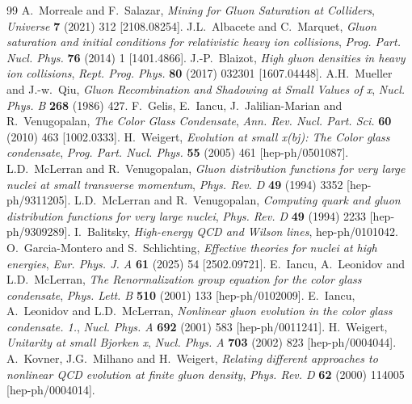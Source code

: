 \documentclass[11pt,a4paper]{article}
\numberwithin{equation}{section}
\begin{document}
\begin{thebibliography}{99}
\small
{} A.~Morreale and F.~Salazar, \emph{Mining for Gluon Saturation at Colliders}, \emph{Universe} \textbf{7} (2021) 312 [2108.08254].
 J.L.~Albacete and C.~Marquet, \emph{Gluon saturation and initial conditions for relativistic heavy ion collisions}, \emph{Prog. Part. Nucl. Phys.} \textbf{76} (2014) 1 [1401.4866].
 J.-P.~Blaizot, \emph{High gluon densities in heavy ion collisions}, \emph{Rept. Prog. Phys.} \textbf{80} (2017) 032301 [1607.04448].
 A.H.~Mueller and J.-w.~Qiu, \emph{Gluon Recombination and Shadowing at Small Values of x}, \emph{Nucl. Phys. B} \textbf{268} (1986) 427.
 F.~Gelis, E.~Iancu, J.~Jalilian-Marian and R.~Venugopalan, \emph{The Color Glass Condensate}, \emph{Ann. Rev. Nucl. Part. Sci.} \textbf{60} (2010) 463 [1002.0333].
 H.~Weigert, \emph{Evolution at small x(bj): The Color glass condensate}, \emph{Prog. Part. Nucl. Phys.} \textbf{55} (2005) 461 [hep-ph/0501087].
 L.D.~McLerran and R.~Venugopalan, \emph{Gluon distribution functions for very large nuclei at small transverse momentum}, \emph{Phys. Rev. D} \textbf{49} (1994) 3352 [hep-ph/9311205].
 L.D.~McLerran and R.~Venugopalan, \emph{Computing quark and gluon distribution functions for very large nuclei}, \emph{Phys. Rev. D} \textbf{49} (1994) 2233 [hep-ph/9309289].
 I.~Balitsky, \emph{High-energy QCD and Wilson lines}, hep-ph/0101042.
 O.~Garcia-Montero and S.~Schlichting, \emph{Effective theories for nuclei at high energies}, \emph{Eur. Phys. J. A} \textbf{61} (2025) 54 [2502.09721].
 E.~Iancu, A.~Leonidov and L.D.~McLerran, \emph{The Renormalization group equation for the color glass condensate}, \emph{Phys. Lett. B} \textbf{510} (2001) 133 [hep-ph/0102009].
 E.~Iancu, A.~Leonidov and L.D.~McLerran, \emph{Nonlinear gluon evolution in the color glass condensate. 1.}, \emph{Nucl. Phys. A} \textbf{692} (2001) 583 [hep-ph/0011241].
 H.~Weigert, \emph{Unitarity at small Bjorken x}, \emph{Nucl. Phys. A} \textbf{703} (2002) 823 [hep-ph/0004044].
 A.~Kovner, J.G.~Milhano and H.~Weigert, \emph{Relating different approaches to nonlinear QCD evolution at finite gluon density}, \emph{Phys. Rev. D} \textbf{62} (2000) 114005 [hep-ph/0004014].

\end{thebibliography}
\end{document}
